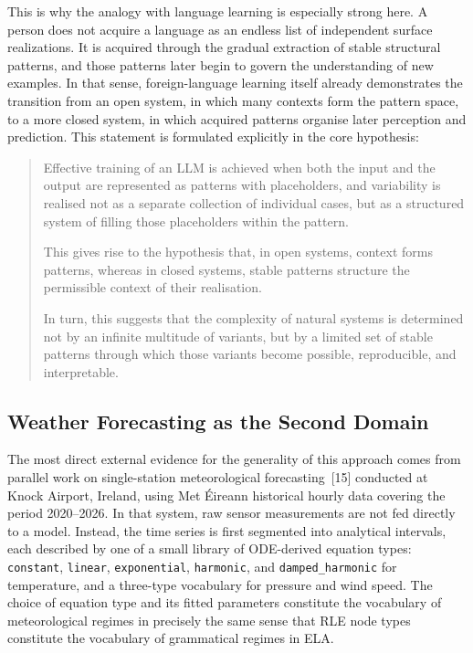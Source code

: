 \documentclass[12pt,a4paper,oneside]{report}
\begin{document}
This is why the analogy with language learning is especially strong here. A person does not
acquire a language as an endless list of independent surface realizations. It is acquired
through the gradual extraction of stable structural patterns, and those patterns later begin
to govern the understanding of new examples. In that sense, foreign-language learning
itself already demonstrates the transition from an open system, in which many contexts
form the pattern space, to a more closed system, in which acquired patterns organise later
perception and prediction. This statement is formulated explicitly in the core hypothesis:

\begin{quote}
Effective training of an LLM is achieved when both the input and the output are represented
as patterns with placeholders, and variability is realised not as a separate collection of
individual cases, but as a structured system of filling those placeholders within the
pattern.

This gives rise to the hypothesis that, in open systems, context forms patterns, whereas in
closed systems, stable patterns structure the permissible context of their realisation.

In turn, this suggests that the complexity of natural systems is determined not by an
infinite multitude of variants, but by a limited set of stable patterns through which those
variants become possible, reproducible, and interpretable.
\end{quote}

\subsection*{Weather Forecasting as the Second Domain}

The most direct external evidence for the generality of this approach comes from parallel
work on single-station meteorological forecasting~[15] conducted at Knock Airport, Ireland,
using Met \'{E}ireann historical hourly data covering the period 2020--2026. In that system, raw
sensor measurements are not fed directly to a model. Instead, the time series is first
segmented into analytical intervals, each described by one of a small library of
ODE-derived equation types: \texttt{constant}, \texttt{linear}, \texttt{exponential},
\texttt{harmonic}, and \texttt{damped\_harmonic} for temperature, and a three-type
vocabulary for pressure and wind speed. The choice of equation type and its fitted
parameters constitute the vocabulary of meteorological regimes in precisely the same sense
that RLE node types constitute the vocabulary of grammatical regimes in ELA.
\end{document}
